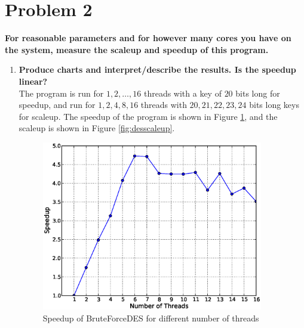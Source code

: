 \documentclass[letterpaper, 11pt]{article}
\begin{document}
\section*{Problem 2}
\textbf{For reasonable parameters and for however many cores you have on the system, measure the scaleup and speedup of this program.}

\begin{enumerate}
    \item \textbf{Produce charts and interpret/describe the results. Is the speedup linear?}\\
        The program is run for $1, 2, \dots, 16$ threads with a key of $20$ bits long for speedup, and run for $1, 2, 4, 8, 16$ threads with $20, 21, 22, 23, 24$ bits long keys for scaleup.
        The speedup of the program is shown in Figure \ref{fig:desspeedup}, and the scaleup is shown in Figure \ref{fig:desscaleup}.
        \begin{figure}[htbp]
            \centering
            \includegraphics[width=3.8in]{desspeedup.eps}
            \caption{Speedup of BruteForceDES for different number of threads}
            \label{fig:desspeedup}
        \end{figure}


\end{enumerate}
\end{document}
